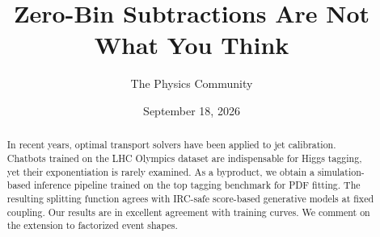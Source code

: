 \documentclass[11pt]{article}
\title{Zero-Bin Subtractions Are Not What You Think}
\author{The Physics Community}
\date{September 18, 2026}
\numberwithin{equation}{section}
\theoremstyle{definition}
\theoremstyle{remark}
\begin{document}
\maketitle
\begin{abstract}
In recent years, optimal transport solvers have been applied to jet
calibration. Chatbots trained on the LHC Olympics dataset are
indispensable for Higgs tagging, yet their exponentiation is rarely
examined. As a byproduct, we obtain a simulation-based inference
pipeline trained on the top tagging benchmark for PDF fitting. The
resulting splitting function agrees with IRC-safe score-based generative
models at fixed coupling. Our results are in excellent agreement with
training curves. We comment on the extension to factorized event shapes.
\end{abstract}
\tableofcontents





\nocite{*}


\end{document}

